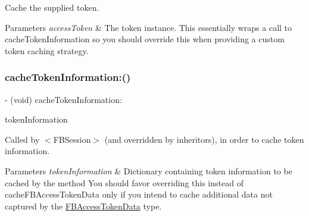 Cache the supplied token. 
\begin{DoxyParams}{Parameters}
{\em access\+Token} & The token instance.  This essentially wraps a call to {\ttfamily cache\+Token\+Information} so you should override this when providing a custom token caching strategy. \\
\hline
\end{DoxyParams}
\mbox{\label{interfaceFBSessionTokenCachingStrategy_a89929f2fc1d8d29bb1add6e607d7c864}} 
\subsubsection{\texorpdfstring{cache\+Token\+Information\+:()}{cacheTokenInformation:()}\hspace{0.1cm}{\footnotesize\ttfamily [1/5]}}
{\footnotesize\ttfamily -\/ (void) cache\+Token\+Information\+: \begin{DoxyParamCaption}\item[{(N\+S\+Dictionary $\ast$)}]{token\+Information }\end{DoxyParamCaption}}

Called by $<$\+F\+B\+Session$>$ (and overridden by inheritors), in order to cache token information.


\begin{DoxyParams}{Parameters}
{\em token\+Information} & Dictionary containing token information to be cached by the method  You should favor overriding this instead of {\ttfamily cache\+F\+B\+Access\+Token\+Data} only if you intend to cache additional data not captured by the \hyperlink{interfaceFBAccessTokenData}{F\+B\+Access\+Token\+Data} type. \\
\hline
\end{DoxyParams}
\mbox{\label{interfaceFBSessionTokenCachingStrategy_a89929f2fc1d8d29bb1add6e607d7c864}} 
